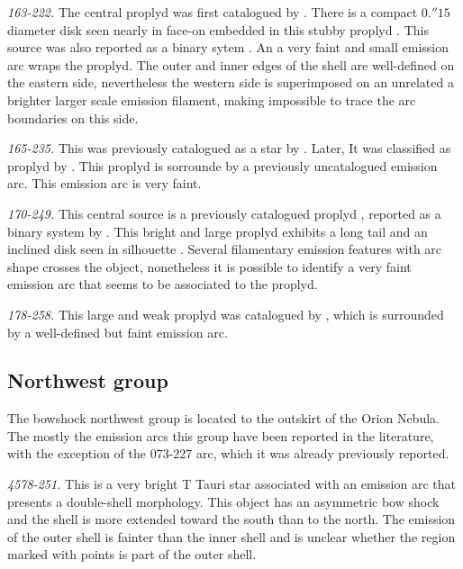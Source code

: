 \documentclass[iop, apj]{emulateapj}
\renewcommand\clearpage{}
\begin{document}
\textit{163-222.} The central proplyd was first catalogued by \citet{ODell:1996a}. There is a compact \(0.''15\) diameter disk seen nearly in face-on embedded in this stubby proplyd \citep{Bally:2000a, Ricci:2008a}.  This source was also reported as a binary sytem \citep{Ricci:2008a}. An a very faint and small emission arc wraps the proplyd. The outer and inner edges of the shell are well-defined on the eastern side, nevertheless the western side is superimposed on an unrelated a brighter larger scale emission filament, making impossible to trace the arc boundaries on this side.

\textit{165-235.} This was previously catalogued as a star by \citet{ODell:1996a}. Later, It was classified as proplyd by \citet{Ricci:2008a}. This proplyd is sorrounde by a previously uncatalogued emission arc. This emission arc is very faint.


\textit{170-249.} This central source is a previously catalogued proplyd \citep{ODell:1996a}, reported as a binary system by \citet{Ricci:2008a}. This bright and large proplyd exhibits a long tail and an inclined disk seen in silhouette \citep{Bally:2000a}. Several filamentary emission features with arc shape crosses the object, nonetheless it is possible to identify a very faint emission arc that seems to be associated to the proplyd.  

\textit{178-258.}  This large and weak proplyd was catalogued by \citet{Ricci:2008a}, which is surrounded by a well-defined but faint emission arc.

\clearpage
\subsection{Northwest group}
\label{sec:nw-group}



The bowshock northwest group is located to the outskirt of the Orion Nebula. The mostly the emission arcs this group have been reported in the literature, with the exception of the  073-227 arc, which it was already previously reported.    

\textit{4578-251.} This is a very bright T Tauri star associated with an emission arc that presents a double-shell morphology. This object has an asymmetric bow shock and the shell is more extended toward the south than to the north. The emission of the outer shell is fainter than the inner shell and is unclear whether the region marked with points is part of the outer shell.
\end{document}

